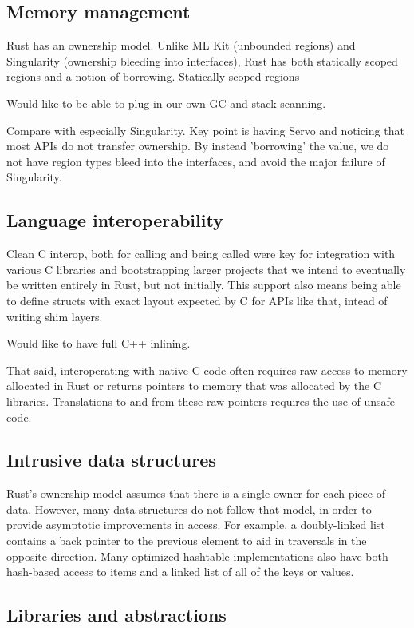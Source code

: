 \subsection{Memory management}
Rust has an ownership model.
Unlike ML Kit (unbounded regions) and Singularity (ownership bleeding into interfaces), Rust has both statically scoped regions and a notion of borrowing.
Statically scoped regions

Would like to be able to plug in our own GC and stack scanning.

Compare with especially Singularity.
Key point is having Servo and noticing that most APIs do not transfer ownership.
By instead 'borrowing' the value, we do not have region types bleed into the interfaces, and avoid the major failure of Singularity.

\subsection{Language interoperability}
Clean C interop, both for calling and being called were key for integration with various C libraries and bootstrapping larger projects that we intend to eventually be written entirely in Rust, but not initially. This support also means being able to define structs with exact layout expected by C for APIs like that, intead of writing shim layers.

Would like to have full C++ inlining.

That said, interoperating with native C code often requires raw access to memory allocated in Rust or returns
pointers to memory that was allocated by the C libraries.
Translations to and from these raw pointers requires the use of unsafe code.

\subsection{Intrusive data structures}

Rust's ownership model assumes that there is a single owner for each piece of data.
However, many data structures do not follow that model, in order to provide asymptotic
improvements in access.
For example, a doubly-linked list contains a back pointer to the previous element to aid
in traversals in the opposite direction.
Many optimized hashtable implementations also have both hash-based access to items
and a linked list of all of the keys or values.

\subsection{Libraries and abstractions}


